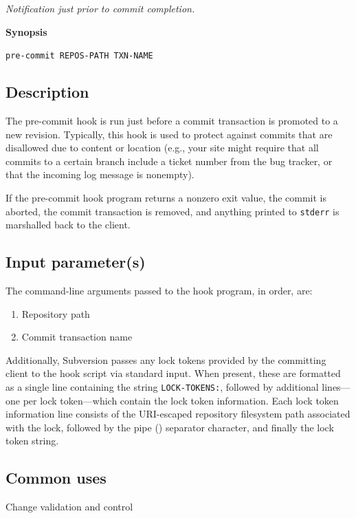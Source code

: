 \emph{Notification just prior to commit completion.}

\textbf{Synopsis}

\texttt{pre-commit\ REPOS-PATH\ TXN-NAME}

\subsection{Description}

The pre-commit hook is run just before a commit transaction is promoted
to a new revision. Typically, this hook is used to protect against
commits that are disallowed due to content or location (e.g., your site
might require that all commits to a certain branch include a ticket
number from the bug tracker, or that the incoming log message is
nonempty).

If the pre-commit hook program returns a nonzero exit value, the commit
is aborted, the commit transaction is removed, and anything printed to
\texttt{stderr} is marshalled back to the client.

\subsection{Input parameter(s)}

The command-line arguments passed to the hook program, in order, are:

\begin{enumerate}
\def\labelenumi{\arabic{enumi}.}
\item
  Repository path
\item
  Commit transaction name
\end{enumerate}

Additionally, Subversion passes any lock tokens provided by the
committing client to the hook script via standard input. When present,
these are formatted as a single line containing the string
\texttt{LOCK-TOKENS:}, followed by additional lines---one per lock
token---which contain the lock token information. Each lock token
information line consists of the URI-escaped repository filesystem path
associated with the lock, followed by the pipe (\texttt{\textbar{}})
separator character, and finally the lock token string.

\subsection{Common uses}

Change validation and control

